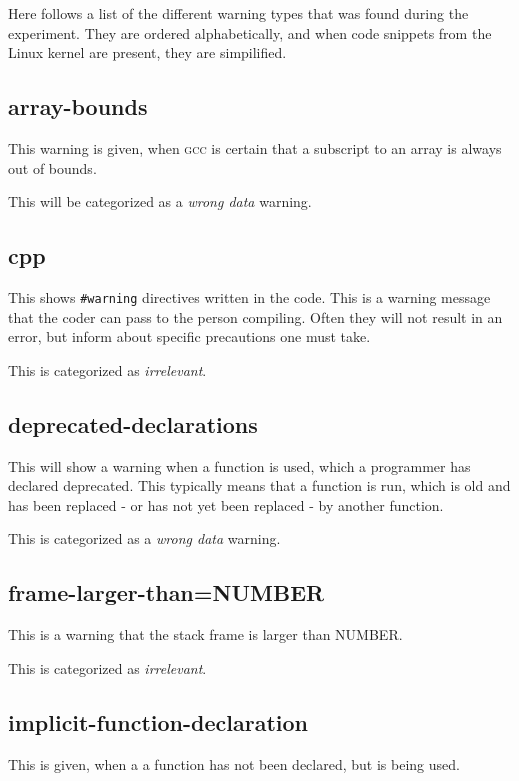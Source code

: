 \documentclass[a4paper,11pt]{report}
\newcommand{\textcode}[1]{\fboxsep=1pt\texttt{\colorbox{gray!20}{#1}}}
\newcommand{\figa}{
    \begin{figure}[!htpb]
    \centering
}
\newcommand{\figb}[2]{
    \caption{#1}
    \label{#2}
    \end{figure}
}
\begin{document}
Here follows a list of the different warning types that was found during the 
experiment.  They are ordered alphabetically, and when code snippets from the 
Linux kernel are present, they are simpilified.


            \subsection*{array-bounds}
This warning is given, when \textsc{gcc} is certain that a subscript to an array is always 
out of bounds.

This will be categorized as a \emph{wrong data} warning.




            \subsection*{cpp}
This shows \textcode{\#warning} directives written in the code. This is a warning
message that the coder can pass to the person compiling. Often they will not result in 
an error, but inform about specific precautions one must take.

This is categorized as \emph{irrelevant}.


            \subsection*{deprecated-declarations}
This will show a warning when a function is used, which a programmer has 
declared deprecated. This typically means that a function is run, which is old
and has been replaced - or has not yet been replaced - by another function.

This is categorized as a \emph{wrong data} warning.


            \subsection*{frame-larger-than=NUMBER}
This is a warning that the stack frame is larger than NUMBER.

This is categorized as \emph{irrelevant}.


            \subsection*{implicit-function-declaration}
This is given, when a a function has not been declared, but is being used.
\end{document}
